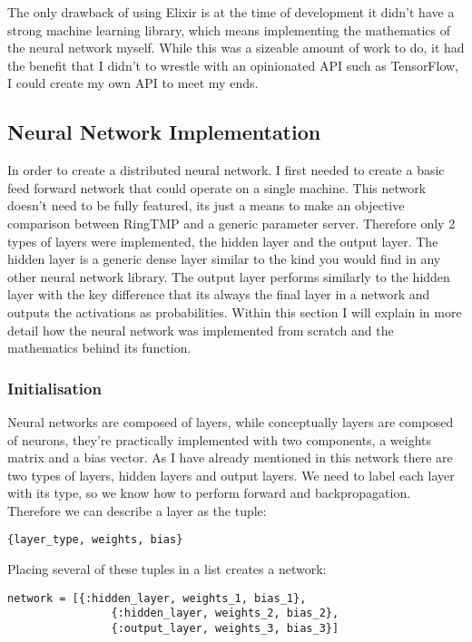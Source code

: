 The only drawback of using Elixir is at the time of development it didn't have a
strong machine learning library, which means implementing the mathematics of the
neural network myself. While this was a sizeable amount of work to do, it had
the benefit that I didn't to wrestle with an opinionated API such as TensorFlow,
I could create my own API to meet my ends.

\subsection{Neural Network Implementation}
In order to create a distributed neural network. I first needed to create a
basic feed forward network that could operate on a single machine. This network
doesn't need to be fully featured, its just a means to make an objective
comparison between RingTMP and a generic parameter server. Therefore only 2
types of layers were implemented, the hidden layer and the output layer. The
hidden layer is a generic dense layer similar to the kind you would find in any
other neural network library. The output layer performs similarly to the hidden
layer with the key difference that its always the final layer in a network and
outputs the activations as probabilities. Within this section I will explain in
more detail how the neural network was implemented from scratch and the
mathematics behind its function.

\subsubsection{Initialisation}
Neural networks are composed of layers, while conceptually layers are
composed of neurons, they're practically implemented with two components, a
weights matrix and a bias vector. As I have already mentioned in this network
there are two types of layers, hidden layers and output layers. We need to label
each layer with its type, so we know how to perform forward and
backpropagation. Therefore we can describe a layer as the tuple:
\begin{lstlisting}[numbers=none,frame=none]
    {layer_type, weights, bias}
\end{lstlisting}

Placing several of these tuples in a list creates a network:
\begin{lstlisting}[numbers=none,frame=none]
  network = [{:hidden_layer, weights_1, bias_1},
                {:hidden_layer, weights_2, bias_2},
                {:output_layer, weights_3, bias_3}]
\end{lstlisting}

